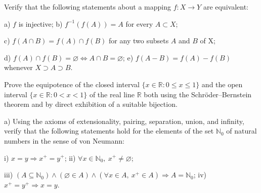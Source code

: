 \begin{exercise}
	Verify that the following statements about a mapping $f:X \to Y$ are equivalent:
	
	a) $f$ is injective; \qquad b) $f^{-1}(f(A))=A$ for every $A \subset X$;
	
	c) $f(A \cap B) = f(A) \cap f(B)$ for any two subsets $A$ and $B$ of X;
	
	d) $f(A) \cap f(B) = \varnothing \Leftrightarrow A \cap B = \varnothing$; \qquad e) $f(A-B) = f(A) - f(B)$ whenever $X \supset A \supset B$.
\end{exercise}

\begin{exercise}
	Prove the equipotence of the closed interval $\{x \in \mathbb{R} : 0 \leq x \leq 1\}$ and the open interval $\{x \in \mathbb{R} : 0 < x < 1\}$ of the real line $\mathbb{R}$ both using the Schröder–Bernstein theorem and by direct exhibition of a suitable bijection.
\end{exercise}

\begin{exercise}
	a) Using the axioms of extensionality, pairing, separation, union, and infinity, verify that the following statements hold for the elements of the set $\mathbb{N}_0$ of natural numbers in the sense of von Neumann: 
	
	i) $x=y \Rightarrow x^+ = y^+$; \qquad ii) $\forall x \in \mathbb{N}_0,~x^+ \neq \varnothing$;
	
	iii) $(A \subseteq \mathbb{N}_0) \wedge (\varnothing \in A) \wedge (\forall x \in A,~x^+ \in A) \Rightarrow A=\mathbb{N}_0$; \qquad iv) $x^+=y^+ \Rightarrow x=y$.
\end{exercise}